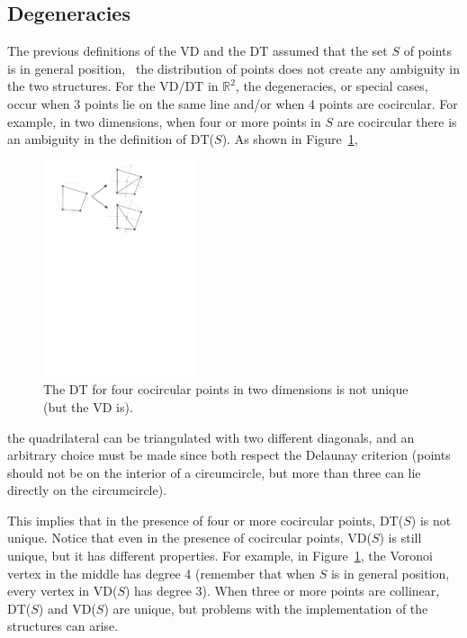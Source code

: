 %
\subsection{Degeneracies}%
\label{sec:degeneracies}

The previous definitions of the VD and the DT assumed that the set $S$ of points is in general position, \ie\ the distribution of points does not create any ambiguity in the two structures. 
For the VD/DT in $\mathbb{R}^{2}$, the degeneracies, or special cases, occur when 3 points lie on the same line and/or when 4 points are cocircular. 
For example, in two dimensions, when four or more points in $S$ are cocircular there is an ambiguity in the definition of DT($S$). 
As shown in Figure~\ref{fig:degeneracies},
\begin{figure}
  \centering
  \includegraphics[width=0.4\textwidth]{figs/degeneracies}
  \caption{The DT for four cocircular points in two dimensions is not unique (but the VD is).}%
\label{fig:degeneracies}
\end{figure}
the quadrilateral can be triangulated with two different diagonals, and an arbitrary choice must be made since both respect the Delaunay criterion (points should not be on the interior of a circumcircle, but more than three can lie directly on the circumcircle).

This implies that in the presence of four or more cocircular points, DT($S$) is not unique. 
Notice that even in the presence of cocircular points, VD($S$) is still unique, but it has different properties. 
For example, in Figure~\ref{fig:degeneracies}, the Voronoi vertex in the middle has degree 4 (remember that when $S$ is in general position, every vertex in VD($S$) has degree 3). 
When three or more points are collinear, DT($S$) and VD($S$) are unique, but problems with the implementation of the structures can arise.


